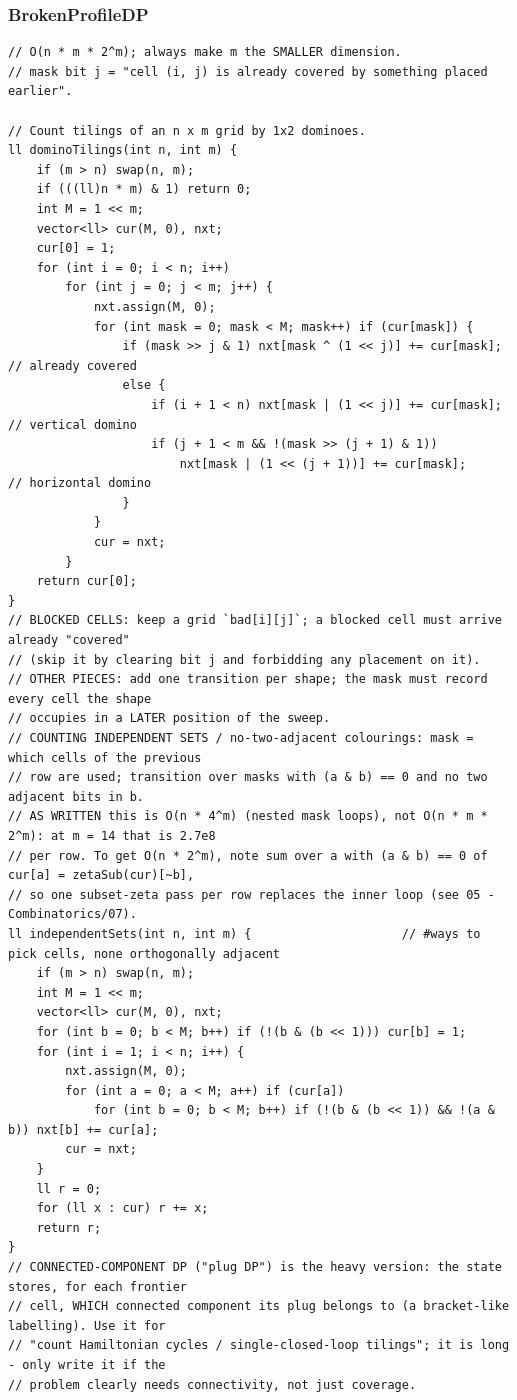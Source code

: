 \documentclass[9pt,a4paper,twocolumn]{extarticle}
\begin{document}
\filbreak
\subsubsection{BrokenProfileDP}
\nopagebreak
\begin{lstlisting}
// O(n * m * 2^m); always make m the SMALLER dimension.
// mask bit j = "cell (i, j) is already covered by something placed earlier".

// Count tilings of an n x m grid by 1x2 dominoes.
ll dominoTilings(int n, int m) {
    if (m > n) swap(n, m);
    if (((ll)n * m) & 1) return 0;
    int M = 1 << m;
    vector<ll> cur(M, 0), nxt;
    cur[0] = 1;
    for (int i = 0; i < n; i++)
        for (int j = 0; j < m; j++) {
            nxt.assign(M, 0);
            for (int mask = 0; mask < M; mask++) if (cur[mask]) {
                if (mask >> j & 1) nxt[mask ^ (1 << j)] += cur[mask];           // already covered
                else {
                    if (i + 1 < n) nxt[mask | (1 << j)] += cur[mask];           // vertical domino
                    if (j + 1 < m && !(mask >> (j + 1) & 1))
                        nxt[mask | (1 << (j + 1))] += cur[mask];                // horizontal domino
                }
            }
            cur = nxt;
        }
    return cur[0];
}
// BLOCKED CELLS: keep a grid `bad[i][j]`; a blocked cell must arrive already "covered"
// (skip it by clearing bit j and forbidding any placement on it).
// OTHER PIECES: add one transition per shape; the mask must record every cell the shape
// occupies in a LATER position of the sweep.
// COUNTING INDEPENDENT SETS / no-two-adjacent colourings: mask = which cells of the previous
// row are used; transition over masks with (a & b) == 0 and no two adjacent bits in b.
// AS WRITTEN this is O(n * 4^m) (nested mask loops), not O(n * m * 2^m): at m = 14 that is 2.7e8
// per row. To get O(n * 2^m), note sum over a with (a & b) == 0 of cur[a] = zetaSub(cur)[~b],
// so one subset-zeta pass per row replaces the inner loop (see 05 - Combinatorics/07).
ll independentSets(int n, int m) {                     // #ways to pick cells, none orthogonally adjacent
    if (m > n) swap(n, m);
    int M = 1 << m;
    vector<ll> cur(M, 0), nxt;
    for (int b = 0; b < M; b++) if (!(b & (b << 1))) cur[b] = 1;
    for (int i = 1; i < n; i++) {
        nxt.assign(M, 0);
        for (int a = 0; a < M; a++) if (cur[a])
            for (int b = 0; b < M; b++) if (!(b & (b << 1)) && !(a & b)) nxt[b] += cur[a];
        cur = nxt;
    }
    ll r = 0;
    for (ll x : cur) r += x;
    return r;
}
// CONNECTED-COMPONENT DP ("plug DP") is the heavy version: the state stores, for each frontier
// cell, WHICH connected component its plug belongs to (a bracket-like labelling). Use it for
// "count Hamiltonian cycles / single-closed-loop tilings"; it is long - only write it if the
// problem clearly needs connectivity, not just coverage.
\end{lstlisting}
\end{document}
